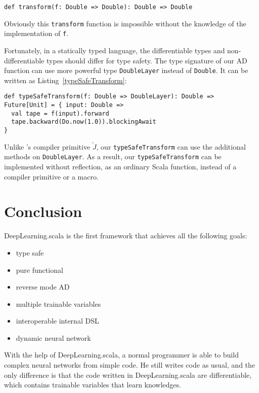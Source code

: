 \begin{lstlisting}[float={h t b p},caption={Impossible transform function for AD}, label={transform}]
def transform(f: Double => Double): Double => Double
\end{lstlisting}

Obviously this \lstinline{transform} function is impossible without the knowledge of the implementation of \lstinline{f}.

Fortunately, in a statically typed language, the differentiable types and non-differentiable types should differ for type safety. The type signature of our AD function can use more powerful type \lstinline{DoubleLayer} instead of \lstinline{Double}. It can be written as Listing~\ref{typeSafeTransform}:

\begin{lstlisting}[float={h t b p},caption={Type safe transform function for AD}, label={typeSafeTransform}]
def typeSafeTransform(f: Double => DoubleLayer): Double => Future[Unit] = { input: Double =>
  val tape = f(input).forward
  tape.backward(Do.now(1.0)).blockingAwait
}
\end{lstlisting}

Unlike \cite{pearlmutter2008reverse}'s compiler primitive $\overleftarrow{J}$, our \lstinline{typeSafeTransform} can use the additional methods on \lstinline{DoubleLayer}. As a result, our \lstinline{typeSafeTransform} can be implemented without reflection, as an ordinary Scala function, instead of a compiler primitive or a macro.

\section{Conclusion}

DeepLearning.scala is the first framework that achieves all the following goals:

\begin{itemize}
  \item type safe
  \item pure functional
  \item reverse mode AD
  \item multiple \glspl{trainable variable}
  \item interoperable internal DSL
  \item dynamic neural network
\end{itemize}

With the help of DeepLearning.scala, a normal programmer is able to build complex neural networks from simple code. He still writes code as usual, and the only difference is that the code written in DeepLearning.scala are differentiable, which contains \glspl{trainable variable} that learn knowledges.

\clearpage
\appendix

\printglossary

\begin{acks}
\end{acks}



